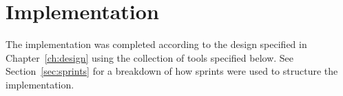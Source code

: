\chapter{Implementation}\label{ch:impl}

The implementation was completed according to the design specified in Chapter~\ref{ch:design} using the collection of tools specified below. See Section~\ref{sec:sprints} for a breakdown of how sprints were used to structure the implementation.


